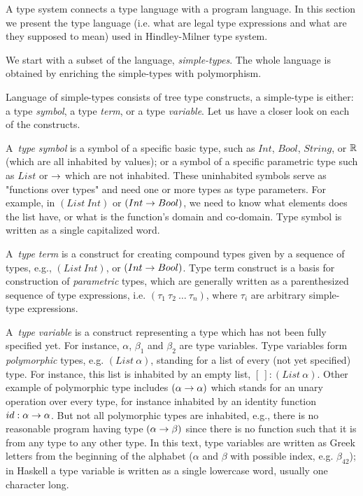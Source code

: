 \documentclass[a4paper,oneside]{memoir}
\begin{document}
A type system connects a type language with a program language.
In this section we present the type language (i.e. what are legal type expressions and what are they supposed to mean) used in Hindley-Milner type system.

We start with a subset of the language, \textit{simple-types}.
The whole language is obtained by enriching the simple-types with polymorphism.

Language of simple-types consists of tree type constructs, a simple-type is either: 
a type \textit{symbol}, 
a type \textit{term}, 
or a type \textit{variable}.
Let us have a closer look on each of the constructs.

A~\textit{type symbol} is a symbol of a specific basic type, such as 
$Int$, $Bool$, $String$, or $\mathbb{R}$ (which are all inhabited by values); 
or a symbol of a specific parametric type such as $List$ or $\rightarrow$ 
which are not inhabited. These uninhabited symbols serve as "functions over types" 
and need one or more types as type parameters. For example, in $(List~Int)$
or $(Int \rightarrow Bool)$, we need to know what elements does the list have, 
or what is the function's domain and co-domain. Type symbol is written as 
a single capitalized word.

A~\textit{type term} is a construct for creating compound types given 
by a sequence of types, e.g., $(List~Int)$, or $(Int \rightarrow Bool)$. 
Type term construct is a basis for construction of \textit{parametric} types,
which are generally written as a parenthesized sequence of type expressions, 
i.e. $(\tau_1~\tau_2~\dots~\tau_n)$, where $\tau_i$ are arbitrary 
simple-type expressions.

A~\textit{type variable} is a construct representing a type which has not been fully
specified yet. For instance, $\alpha$, $\beta_1$ and $\beta_2$ are type variables.
Type variables form \textit{polymorphic} types, 
e.g. $(List~\alpha)$, standing for a list of every (not yet specified) type. For instance,
this list is inhabited by an empty list, $[~] : (List~\alpha)$.
Other example of polymorphic type includes $(\alpha \rightarrow \alpha)$ which stands for an unary 
operation over every type, for instance inhabited by
an identity function $id : \alpha \rightarrow \alpha$. 
But not all polymorphic types are inhabited, e.g., there is no reasonable program having 
type $(\alpha \rightarrow \beta)$ since there is no function such that it is from any type to any other 
type. 
In this text, type variables are written as Greek letters from the beginning of the alphabet ($\alpha$ and $\beta$ with possible index, e.g. $\beta_{42}$); 
in Haskell a type variable is written as a single lowercase word, usually one character long.
\end{document}

